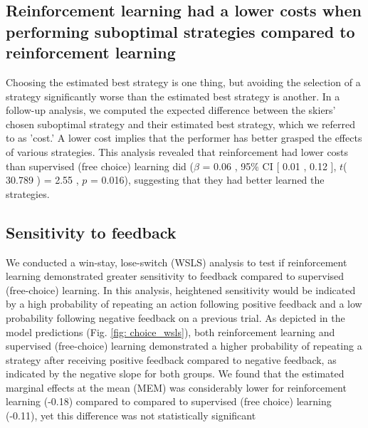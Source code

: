 \documentclass[pdflatex,sn-mathphys-num]{sn-jnl}%
\theoremstyle{thmstyleone}%
\theoremstyle{thmstyletwo}%
\theoremstyle{thmstylethree}%
\begin{document}
\subsection{Reinforcement learning had a lower costs when performing suboptimal strategies compared to  reinforcement learning}\label{subsubsec3}
Choosing the estimated best strategy is one thing, but avoiding the selection of a strategy significantly worse than the estimated best strategy is another. In a follow-up analysis, we computed the expected difference between the skiers' chosen suboptimal strategy and their estimated best strategy, which we referred to as 'cost.' A lower cost implies that the performer has better grasped the effects of various strategies. This analysis revealed that reinforcement had lower costs than supervised (free choice) learning did  ($\beta$ = 0.06 , 95\% CI [ 0.01 ,  0.12 ], $t$( 30.789 ) = 2.55 , $p$  =  0.016), suggesting that they had better learned the strategies.



\subsection{Sensitivity to feedback}\label{subsec5}
We conducted a win-stay, lose-switch (WSLS) analysis to test if reinforcement learning demonstrated greater sensitivity to feedback compared to supervised (free-choice) learning. In this analysis, heightened sensitivity would be indicated by a high probability of repeating an action following positive feedback and a low probability following negative feedback on a previous trial. As depicted in the model predictions (Fig. \ref{fig: choice_wsls}), both reinforcement learning and supervised (free-choice) learning demonstrated a higher probability of repeating a strategy after receiving positive feedback compared to negative feedback, as indicated by the negative slope for both groups. We found that the estimated marginal effects at the mean (MEM) was considerably lower for reinforcement learning (-0.18) compared to compared to supervised (free choice) learning (-0.11), yet this difference was not statistically significant %
\end{document}
